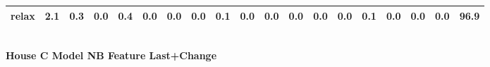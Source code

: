 \documentclass{article}
\begin{document}
\begin{sideways}
\begin{tabular}{lrrrrrrrrrrrrrrrrrr}
relax                         &         2.1 &                0.3 &           0.0 &                          0.4 &                0.0 &                0.0 &                        0.0 &          0.1 &              0.0 &                0.0 &                    0.0 &                      0.0 &                  0.0 &                   0.1 &              0.0 &              0.0 &                                  0.0 &         96.9 \\
\bottomrule
\end{tabular}
\end{sideways}
\normalsize
\vspace{1cm}\\
\textbf{House C Model NB Feature Last+Change}\\
\vspace{1cm}\\
\end{document}
